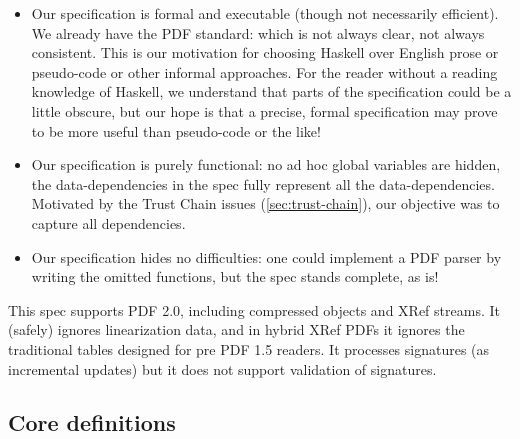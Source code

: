 \begin{itemize}
\item Our specification is formal and executable (though not
  necessarily efficient).
  We already have the PDF standard: which is not always clear, not always
  consistent. 
  This is our motivation for choosing Haskell over English prose or
  pseudo-code or other informal approaches.
  For the reader
  without a reading knowledge of Haskell, we understand that parts of
  the specification could be a little obscure, but our hope is that a
  precise, formal specification may prove to be more useful than
  pseudo-code or the like!
  
\item Our specification is purely functional: no ad hoc global variables are
  hidden, the data-dependencies in the spec fully represent all the
  data-dependencies.  Motivated by the Trust Chain issues
  (\cref{sec:trust-chain}), our objective was to capture all dependencies.
  
\item Our specification hides no difficulties: one could implement a PDF parser
  by writing the omitted functions, but the spec stands complete, as
  is!
\end{itemize}

This spec supports PDF 2.0, including compressed objects and XRef streams.
%
It (safely) ignores linearization data, and in hybrid XRef PDFs
it ignores the traditional \xref{} tables designed for pre PDF 1.5 readers.
It processes signatures (as incremental updates) but it does not support
validation of signatures.

\subsection{Core definitions}
\label{sec:core}
\iffalse
\begin{code}
{-# LANGUAGE EmptyDataDecls, TypeOperators, LambdaCase #-}
module Spec where
import           Control.Monad
import           Data.Char
import           Data.Foldable(foldlM)
import qualified Data.IntSet as IntSet
import           Data.List
import qualified Data.Map as M
import           Data.Map(Map)
import           Types
import           Utils
import           Primitives
import           Streams
\end{code}
\fi

